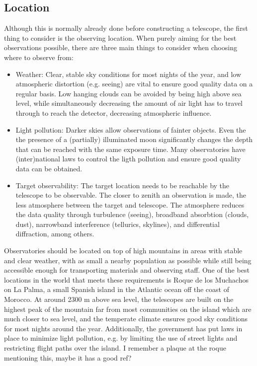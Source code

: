 \documentclass[a4paper,oneside,12pt, class=Latex/Classes/PhDthesisPSnPDF, crop=false]{standalone}
\begin{document}
\subsection{Location}
Although this is normally already done before constructing a telescope, the first thing to consider is the observing location. When purely aiming for the best observations possible, there are three main things to consider when choosing where to observe from:
\begin{itemize}
    \item {Weather: Clear, stable sky conditions for most nights of the year, and low atmospheric distortion (e.g. seeing) are vital to ensure good quality data on a regular basis. Low hanging clouds can be avoided by being high above sea level, while simultaneously decreasing the amount of air light has to travel through to reach the detector, decreasing atmospheric influence.}
    \item {Light pollution: Darker skies allow observations of fainter objects. Even the the presence of a (partially) illuminated moon significantly changes the depth that can be reached with the same exposure time. Many observatories have (inter)national laws to control the ligth pollution and ensure good quality data can be obtained.}
    \item {Target observability: The target location needs to be reachable by the telescope to be observable. The closer to zenith an observation is made, the less atmosphere between the target and telescope. The atmosphere reduces the data quality through turbulence (seeing), broadband absorbtion (clouds, dust), narrowband interference (tellurics, skylines), and differential diffraction, among others.}
\end{itemize}

Observatories should be located on top of high mountains in areas with stable and clear weather, with as small a nearby population as possible while still being accessible enough for transporting materials and observing staff. One of the best locations in the world that meets these requirements is Roque de los Muchachos on La Palma, a small Spanish island in the Atlantic ocean off the coast of Morocco. At around 2300 m above sea level, the telescopes are built on the highest peak of the mountain far from most communities on the island which are much closer to sea level, and the temperate climate ensures good sky conditions for most nights around the year. Additionally, the government has put laws in place to minimize light pollution, e.g. by limiting the use of street lights and restricting flight paths over the island. \color{red} I remember a plaque at the roque mentioning this, maybe it has a good ref? \color{black}
\end{document}
